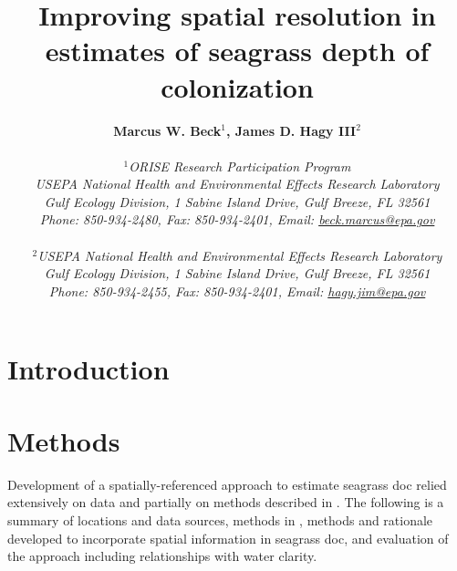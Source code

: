 \documentclass[letterpaper,12pt,oneside]{article}\usepackage[]{graphicx}\usepackage[]{color}
\begin{document}
\raggedbottom
\linenumbers
\raggedright
{}
\setlength{\parindent}{0.5in}
\renewcommand\refname{References \vspace{12pt}}

\begin{singlespace}
\title{{\bf {\Large Improving spatial resolution in estimates of seagrass depth of colonization}}}
\author{
  {\bf {\normalsize Marcus W. Beck$^1$, James D. Hagy III$^2$}}
  \\\\{\textit {\normalsize $^1$ORISE Research Participation Program}}
  \\{\textit {\normalsize USEPA National Health and Environmental Effects Research Laboratory}}
  \\{\textit {\normalsize Gulf Ecology Division, 1 Sabine Island Drive, Gulf Breeze, FL 32561}}
	\\{\textit {\normalsize Phone: 850-934-2480, Fax: 850-934-2401, Email: \href{mailto:beck.marcus@epa.gov}{beck.marcus@epa.gov}}}
  \\\\{\textit {\normalsize $^2$USEPA National Health and Environmental Effects Research Laboratory}}
	\\{\textit {\normalsize Gulf Ecology Division, 1 Sabine Island Drive, Gulf Breeze, FL 32561}}
	\\{\textit {\normalsize Phone: 850-934-2455, Fax: 850-934-2401, Email: \href{mailto:hagy.jim@epa.gov}{hagy.jim@epa.gov}}}
	}
\date{}
\maketitle
\end{singlespace}
\clearpage

\section{Introduction}

\section{Methods}

Development of a spatially-referenced approach to estimate seagrass \ac{doc} relied extensively on data and partially on methods described in .  The following is a summary of locations and data sources, methods in , methods and rationale developed to incorporate spatial information in seagrass \ac{doc}, and evaluation of the approach including relationships with water clarity.   
\end{document}
